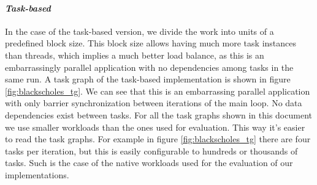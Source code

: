 \paragraph{\textit{Task-based}} In the case of the task-based version, we
divide the work into units of a predefined block size. This block size allows
having much more task instances than threads, which implies a much better load
balance, as this is an embarrassingly parallel application with no dependencies
among tasks in the same run.  A task graph of the task-based implementation is
shown in figure \ref{fig:blackscholes_tg}.  We can see that this is an embarrassing
parallel application with only barrier synchronization between iterations of the 
main loop.  No data dependencies exist between tasks.
For all the task graphs shown in this document
we use smaller workloads than the ones used for evaluation.  This way it's easier
to read the task graphs.  For example in figure \ref{fig:blackscholes_tg} there are
four tasks per iteration, but this is easily configurable to hundreds or thousands 
of tasks.  Such is the case of the native workloads used for the evaluation of our 
implementations.



